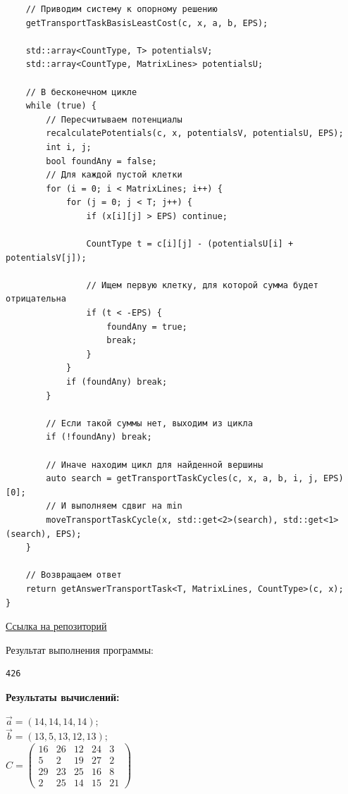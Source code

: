 \documentclass[a4paper,14pt]{extarticle}
\begin{document}
\begin{verbatim}
    // Приводим систему к опорному решению
    getTransportTaskBasisLeastCost(c, x, a, b, EPS);

    std::array<CountType, T> potentialsV;
    std::array<CountType, MatrixLines> potentialsU;

    // В бесконечном цикле
    while (true) {
        // Пересчитываем потенциалы
        recalculatePotentials(c, x, potentialsV, potentialsU, EPS);
        int i, j;
        bool foundAny = false;
        // Для каждой пустой клетки
        for (i = 0; i < MatrixLines; i++) {
            for (j = 0; j < T; j++) {
                if (x[i][j] > EPS) continue;

                CountType t = c[i][j] - (potentialsU[i] + potentialsV[j]);
                
                // Ищем первую клетку, для которой сумма будет отрицательна
                if (t < -EPS) {
                    foundAny = true;
                    break;
                }
            }
            if (foundAny) break;
        }

        // Если такой суммы нет, выходим из цикла
        if (!foundAny) break;

        // Иначе находим цикл для найденной вершины
        auto search = getTransportTaskCycles(c, x, a, b, i, j, EPS)[0];
        // И выполняем сдвиг на min
        moveTransportTaskCycle(x, std::get<2>(search), std::get<1>(search), EPS);
    }

    // Возвращаем ответ
    return getAnswerTransportTask<T, MatrixLines, CountType>(c, x);
}
    \end{verbatim}
\href{https://github.com/IAmProgrammist/operations_research/blob/master/src/libs/alg/lab4/task2.tpp}{Ссылка на репозиторий}\bigbreak

Результат выполнения программы:
\begin{verbatim}
426
\end{verbatim}

\textbf{Результаты вычислений: }\\
\begin{center}
    $\vec{a}=(14,14,14,14);$\\
    $\vec{b}=(13,5,13,12,13);$\\
    $C = \begin{pmatrix}
        16&26&12&24&3\\
        5&2&19&27&2\\
        29&23&25&16&8\\
        2&25&14&15&21
    \end{pmatrix}$\\
\end{center}
\end{document}
